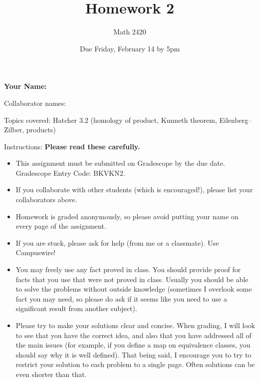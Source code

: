\documentclass[11pt]{article}
\author{Math 2420}
\date{Due Friday, February 14 by 5pm}
\title{Homework 2}
\begin{document}
\maketitle

{\bf\Large Your Name:} 

Collaborator names: 


\vspace{.3in}
Topics covered: Hatcher 3.2 (homology of product, Kunneth theorem, Eilenberg--Zilber, products)

Instructions: {\bf Please read these carefully.} 
\begin{itemize}
\item This assignment must be submitted on Gradescope by the due date. Gradescope Entry Code: BKVKN2. 
\item If you collaborate with other students (which is encouraged!), please list your collaborators above. 
\item Homework is graded anonymously, so please avoid putting your name on every page of the assignment.
\item If you are stuck, please ask for help (from me or a classmate). Use Campuswire!  
\item You may freely use any fact proved in class. You should provide proof for facts that you use that were not proved in class. Usually you should be able to solve the problems without outside knowledge (sometimes I overlook some fact you may need, so please do ask if it seems like you need to use a significant result from another subject). 
\item Please try to make your solutions clear and concise. When grading, I will look to see that you have the correct idea, and also that you have addressed all of the main issues (for example, if you define a map on equivalence classes, you should say why it is well defined). That being said, I encourage you to try to restrict your solution to each problem to a single page. Often solutions can be even shorter than that. 
\end{itemize}
\pagebreak 




\pagebreak 
\end{document}
